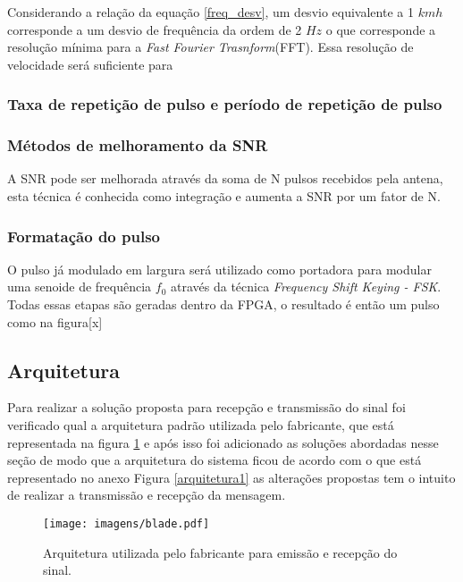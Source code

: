  Considerando a relação da equação \ref{freq_desv}, um desvio equivalente a 1 $kmh$ corresponde a um desvio de frequência da ordem de 2 $Hz$ o que corresponde a resolução mínima para a \emph{Fast Fourier Trasnform}(FFT). Essa resolução de velocidade será suficiente para %
 \subsubsection{Taxa de repetição de pulso e período de repetição de pulso}
 
 
\subsubsection{Métodos de melhoramento da SNR}%
A SNR pode ser melhorada através da soma de N pulsos recebidos pela antena, esta técnica é conhecida como integração %
e aumenta a SNR por um fator de N.

\subsubsection{Formatação do pulso}
O pulso já modulado em largura será utilizado como portadora para modular uma senoide de frequência $f_0$ através da técnica \emph{Frequency Shift Keying - FSK}. Todas essas etapas são geradas dentro da FPGA, o resultado é então um pulso como na figura[x] %

\subsection{Arquitetura}

Para realizar a solução proposta para recepção e transmissão do sinal foi verificado qual a arquitetura padrão utilizada pelo fabricante, que está representada na figura \ref{arquitetura} e após isso foi adicionado as soluções abordadas nesse seção de modo que a arquitetura do sistema ficou de acordo com o que está representado no anexo  Figura \ref{arquitetura1} as alterações propostas tem o intuito de realizar a transmissão e recepção da mensagem.
\begin{figure}[H]
    \centering
   \texttt{[image: imagens/blade.pdf]}
   \caption{Arquitetura utilizada pelo fabricante para emissão e recepção do sinal.}
   \label{arquitetura}
    \end{figure}
    
